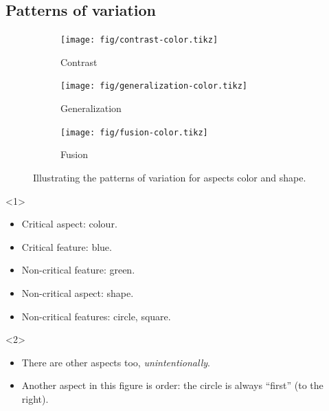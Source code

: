 \subsection{Patterns of variation}

\begin{frame}
  \begin{figure}
    \begin{subfigure}{0.3\columnwidth}
      \centering
      \texttt{[image: fig/contrast-color.tikz]}
      \caption{Contrast}
    \end{subfigure}
    \hfill
    \begin{subfigure}{0.3\columnwidth}
      \centering
      \texttt{[image: fig/generalization-color.tikz]}
      \caption{Generalization}
    \end{subfigure}
    \hfill
    \begin{subfigure}{0.3\columnwidth}
      \centering
      \texttt{[image: fig/fusion-color.tikz]}
      \caption{Fusion}
    \end{subfigure}
    \caption{%
      Illustrating the patterns of variation for aspects color and shape.
    }
  \end{figure}

  \begin{onlyenv}<1>
    \begin{example}
      \begin{itemize}
        \item Critical aspect: colour.
        \item Critical feature: blue.
        \item Non-critical feature: green.
        \item Non-critical aspect: shape.
        \item Non-critical features: circle, square.
      \end{itemize}
    \end{example}
  \end{onlyenv}
  \begin{onlyenv}<2>
    \begin{remark}
      \begin{itemize}
        \item There are other aspects too, \emph{unintentionally}.
        \item Another aspect in this figure is order: the circle is always 
          \enquote{first} (to the right).
      \end{itemize}
    \end{remark}
  \end{onlyenv}
\end{frame}

